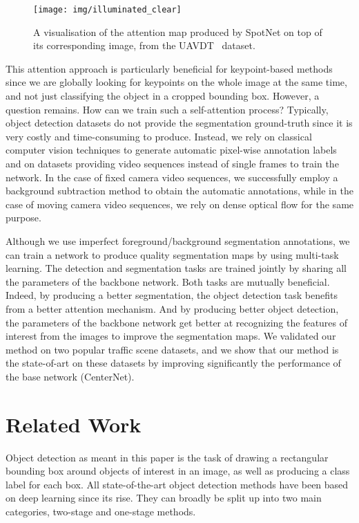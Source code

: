 \documentclass[10pt, conference, compsocconf]{IEEEtran}
\begin{document}
\begin{figure}[t]
\begin{center}
\texttt{[image: img/illuminated\_clear]}
\end{center}
   \caption{A visualisation of the attention map produced by SpotNet on top of its corresponding image, from the UAVDT~\cite{du2018unmanned} dataset.}
\label{illuminated}
\end{figure}

This attention approach is particularly beneficial for keypoint-based methods since we are globally looking for keypoints on the whole image at the same time, and not just classifying the object in a cropped bounding box. However, a question remains. How can we train such a self-attention process? Typically, object detection datasets do not provide the segmentation ground-truth since it is very costly and time-consuming to produce. Instead, we rely on classical computer vision techniques to generate automatic pixel-wise annotation labels and on datasets providing video sequences instead of single frames to train the network. In the case of fixed camera video sequences, we successfully employ a background subtraction method to obtain the automatic annotations, while in the case of moving camera video sequences, we rely on dense optical flow for the same purpose. 

Although we use imperfect foreground/background segmentation annotations, we can train a network to produce quality segmentation maps by using multi-task learning. The detection and segmentation tasks are trained jointly by sharing all the parameters of the backbone network. Both tasks are mutually beneficial. Indeed, by producing a better segmentation, the object detection task benefits from a better attention mechanism. And by producing better object detection, the parameters of the backbone network get better at recognizing the features of interest from the images to improve the segmentation maps. We validated our method on two popular traffic scene datasets, and we show that our method is the state-of-art on these datasets by improving significantly the performance of the base network (CenterNet). 

\section{Related Work}

Object detection as meant in this paper is the task of drawing a rectangular bounding box around objects of interest in an image, as well as producing a class label for each box. All state-of-the-art object detection methods have been based on deep learning since its rise. They can broadly be split up into two main categories, two-stage and one-stage methods.
\end{document}
